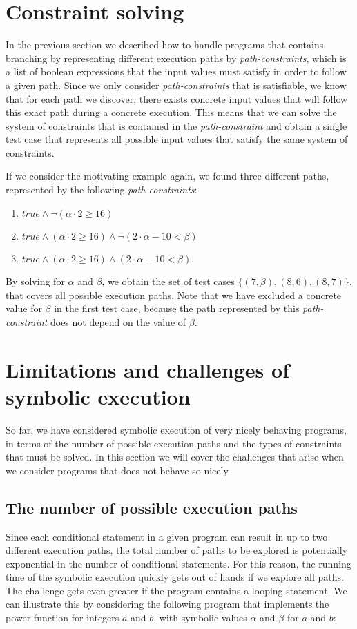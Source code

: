 \section{Constraint solving}
	In the previous section we described how to handle programs that contains branching by representing different execution paths by \emph{path-constraints}, which is a list of boolean expressions that the input values must satisfy in order to follow a given path. Since we only consider \emph{path-constraints} that is satisfiable, we know that for each path we discover, there exists concrete input values that will follow this exact path during a concrete execution. This means that we can solve the system of constraints that is contained in the \emph{path-constraint} and obtain a single test case that represents all possible input values that satisfy the same system of constraints. 
	
	If we consider the motivating example again, we found three different paths, represented by the following \emph{path-constraints}:
	\begin{enumerate}
		\item $true \land \neg (\alpha \cdot 2 \geq 16)$
		\item $true \land (\alpha \cdot 2 \geq 16) \land \neg (2\cdot \alpha - 10 < \beta)$
		\item $true \land (\alpha \cdot 2 \geq 16) \land (2\cdot \alpha - 10 < \beta)$.
	\end{enumerate}
	
	By solving for $\alpha$ and $\beta$, we obtain the set of test cases $\{(7, \beta), (8,6), (8, 7)\}$, that covers all possible execution paths. Note that we have excluded a concrete value for $\beta$ in the first test case, because the path represented by this \emph{path-constraint} does not depend on the value of $\beta$.
	 
\section{Limitations and challenges of symbolic execution}
	So far, we have considered symbolic execution of very nicely behaving programs, in terms of the number of possible execution paths and the types of constraints that must be solved. 
	In this section we will cover the challenges that arise when we consider programs that does not behave so nicely.
	
	\subsection{The number of possible execution paths} 
		Since each conditional statement in a given program can result in up to two different execution paths, the total number of paths to be explored is potentially exponential in the number of conditional statements. 
		For this reason, the running time of the symbolic execution quickly gets out of hands if we explore all paths. 
		 The challenge gets even greater if the program contains a looping statement. We can illustrate this by considering the following program that implements the power-function for integers $a$ and $b$, with symbolic values $\alpha$ and $\beta$ for $a$ and $b$:
		\pow{}
		

